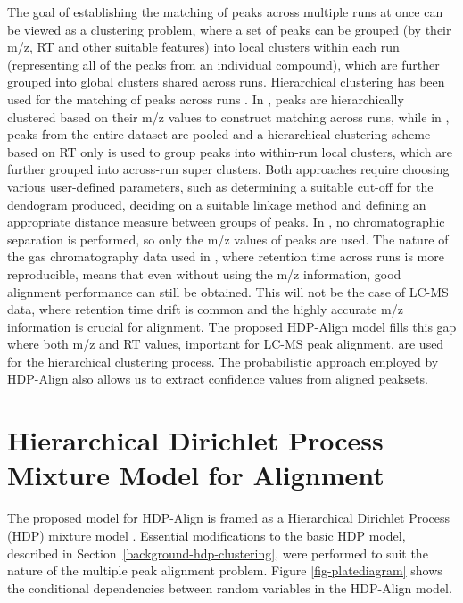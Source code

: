 The goal of establishing the matching of peaks across multiple runs at once can be viewed as a clustering problem, where a set of peaks can be grouped (by their m/z, RT and other suitable features) into local clusters within each run (representing all of the peaks from an individual compound), which are further grouped into global clusters shared across runs. Hierarchical clustering has been used for the matching of peaks across runs \cite{Tibshirani2004, DeSouza2006}. In \cite{Tibshirani2004}, peaks are hierarchically clustered based on their m/z values to construct matching across runs, while in \cite{DeSouza2006}, peaks from the entire dataset are pooled and a hierarchical clustering scheme based on RT only is used to group peaks into within-run local clusters, which are further grouped into across-run super clusters. Both approaches require choosing various user-defined parameters, such as determining a suitable cut-off for the dendogram produced, deciding on a suitable linkage method and defining an appropriate distance measure between groups of peaks. In \cite{Tibshirani2004}, no chromatographic separation is performed, so only the m/z values of peaks are used. The nature of the gas chromatography data used in \cite{DeSouza2006}, where retention time across runs is more reproducible, means that even without using the m/z information, good alignment performance can still be obtained. This will not be the case of LC-MS data, where retention time drift is common and the highly accurate m/z information is crucial for alignment. The proposed HDP-Align model fills this gap where both m/z and RT values, important for LC-MS peak alignment, are used for the hierarchical clustering process. The probabilistic approach employed by HDP-Align also allows us to extract confidence values from aligned peaksets.

\section{Hierarchical Dirichlet Process Mixture Model for Alignment}

The proposed model for HDP-Align is framed as a Hierarchical Dirichlet Process (HDP) mixture model \cite{teh2012hierarchical}. Essential modifications to the basic HDP model, described in Section~\ref{background-hdp-clustering}, were performed to suit the nature of the multiple peak alignment problem. Figure \ref{fig-platediagram} shows the conditional dependencies between random variables in the HDP-Align model.

